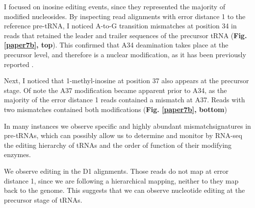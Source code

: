 \documentclass[12pt]{rockefeller}
\begin{document}
I focused on inosine editing events, since they represented the majority of modified nucleosides. By inspecting read alignments with error distance 1 to the reference pre-tRNA, I noticed A-to-G transition mismatches at position 34 in reads that retained the leader and trailer sequences of the precursor tRNA (\textbf{Fig. \ref{paper7b}, top}). 
This confirmed that A34 deamination takes place at the precursor level, and therefore is a nuclear modification, as it has been previously reported \cite{Torres:2015ed}. 

Next, I noticed that 1-methyl-inosine at position 37 also appears at the precursor stage. Of note the A37 modification became apparent prior to A34, as the majority of the error distance 1 reads contained a mismatch at A37. Reads with two mismatches contained both modifications (\textbf{Fig. \ref{paper7b}, bottom})

In many instances we observe specific and highly abundant mismatchsignatures in pre-tRNAs, which can possibly allow us to determine and monitor by RNA-seq the editing hierarchy of tRNAs and the order of function of their modifying enzymes. 

We observe editing in the D1 alignments. Those reads do not map at error distance 1, since we are following a hierarchical mapping, neither to they map back to the genome. This suggests that we can observe nucleotide editing at the precursor stage of tRNAs. 

\end{document}
